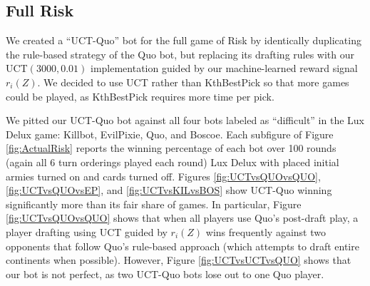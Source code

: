 \documentclass[letterpaper]{article}
\numberwithin{equation}{section}
\numberwithin{theorem}{section}
\numberwithin{lemma}{section}
\numberwithin{df}{section}
\begin{document}
\subsection{Full Risk}


We created a ``UCT-Quo'' bot for the full game of Risk by identically duplicating the rule-based strategy of the Quo bot, but replacing its drafting rules with our UCT$(3000,0.01)$ implementation guided by our machine-learned reward signal $r_i(Z)$.  We decided to use UCT rather than KthBestPick so that more games could be played, as KthBestPick requires more time per pick.  

We pitted our UCT-Quo bot against all four bots labeled as ``difficult'' in the Lux Delux game: Killbot, EvilPixie, Quo, and Boscoe.  Each subfigure of Figure \ref{fig:ActualRisk} reports the winning percentage of each bot over 100 rounds (again all 6 turn orderings played each round) Lux Delux with placed initial armies turned on and cards turned off.  Figures \ref{fig:UCTvsQUOvsQUO}, \ref{fig:UCTvsQUOvsEP}, and \ref{fig:UCTvsKILvsBOS} show UCT-Quo winning significantly more than its fair share of games.  In particular, Figure \ref{fig:UCTvsQUOvsQUO} shows that when all players use Quo's post-draft play, a player drafting using UCT guided by $r_i(Z)$ wins frequently against two opponents that follow Quo's rule-based approach (which attempts to draft entire continents when possible).  However, Figure \ref{fig:UCTvsUCTvsQUO} shows that our bot is not perfect, as two UCT-Quo bots lose out to one Quo player.  

\end{document}
